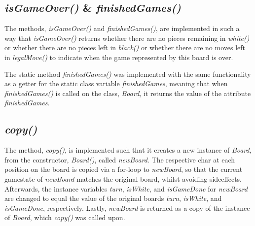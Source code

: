 \documentclass[12pt, a4paper]{article}
\begin{document}
\subsection{\emph{isGameOver()} \& \emph{finishedGames()}}
The methods, \emph{isGameOver()} and \emph{finishedGames()}, are implemented in such a way that \emph{isGameOver()} returns whether there are no pieces remaining in \emph{white()} or whether there are no pieces left in \emph{black()} or whether there are no moves left in \emph{legalMove()} to indicate when the game represented by this board is over. \par
The static method \emph{finishedGames()} was implemented with the same functionality as a getter for the static class variable \emph{finishedGames}, meaning that when \emph{finishedGames()} is called on the class, \emph{Board}, it returns the value of the attribute \emph{finishedGames}.

\subsection{\emph{copy()}}
The method, \emph{copy()}, is implemented such that it creates a new instance of \emph{Board}, from the constructor, \emph{Board()}, called \emph{newBoard}. The respective char at each position on the board is copied via a for-loop to \emph{newBoard}, so that the current gamestate of \emph{newBoard} matches the original board, whilst avoiding sideeffects. Afterwards, the instance variables \emph{turn}, \emph{isWhite}, and \emph{isGameDone} for \emph{newBoard} are changed to equal the value of the original boards \emph{turn}, \emph{isWhite}, and \emph{isGameDone}, respectively. Lastly, \emph{newBoard} is returned as a copy of the instance of \emph{Board}, which \emph{copy()} was called upon. \par
\end{document}
